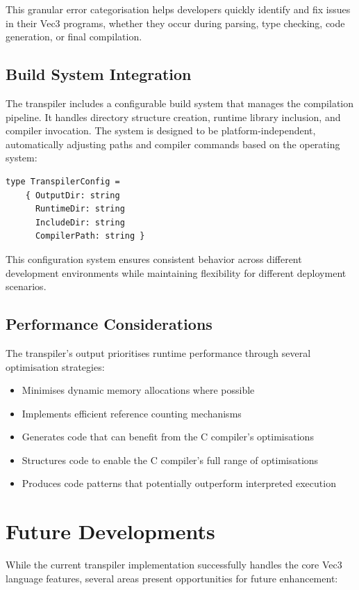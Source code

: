This granular error categorisation helps developers quickly identify and fix issues in their Vec3 programs, whether they occur during parsing, type checking, code generation, or final compilation.

\subsection{Build System Integration}\label{subsec:build-system-integration}
The transpiler includes a configurable build system that manages the compilation pipeline.
It handles directory structure creation, runtime library inclusion, and compiler invocation.
The system is designed to be platform-independent, automatically adjusting paths and compiler commands based on the operating system:

\begin{verbatim}
type TranspilerConfig =
    { OutputDir: string
      RuntimeDir: string
      IncludeDir: string
      CompilerPath: string }
\end{verbatim}

This configuration system ensures consistent behavior across different development environments while maintaining flexibility for different deployment scenarios.

\subsection{Performance Considerations}\label{subsec:performance-considerations}

The transpiler's output prioritises runtime performance through several optimisation strategies:

\begin{itemize}[nolistsep]
\item Minimises dynamic memory allocations where possible
\item Implements efficient reference counting mechanisms
\item Generates code that can benefit from the C compiler's optimisations
\item Structures code to enable the C compiler's full range of optimisations
\item Produces code patterns that potentially outperform interpreted execution
\end{itemize}

\section{Future Developments}\label{sec:future-developments}
While the current transpiler implementation successfully handles the core Vec3 language features, several areas present opportunities for future enhancement:

